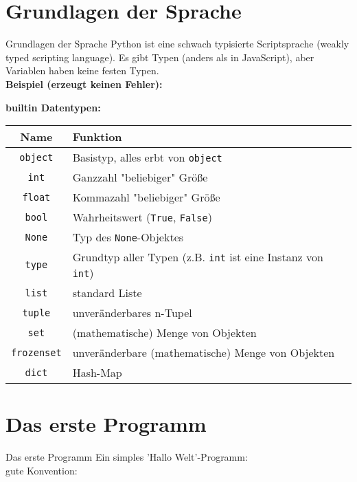 \section{Grundlagen der Sprache}
\begin{frame}[fragile]{Grundlagen der Sprache}
    Python ist eine schwach typisierte Scriptsprache (weakly typed scripting language). Es gibt Typen (anders als in JavaScript), aber Variablen haben keine festen Typen.\\

    \textbf{Beispiel (erzeugt keinen Fehler):}
    
\end{frame}

\begin{frame}
	\textbf{builtin Datentypen:}\\
	\begin{tabular}{c|l}
		Name & Funktion \\ \hline
		\texttt{object} & Basistyp, alles erbt von \texttt{object} \\
		\texttt{int} & Ganzzahl "beliebiger" Größe \\
		\texttt{float} & Kommazahl "beliebiger" Größe \\
		\texttt{bool} & Wahrheitswert (\texttt{True}, \texttt{False})\\
		\texttt{None} & Typ des \texttt{None}-Objektes \\
		\texttt{type} & Grundtyp aller Typen (z.B. \texttt{int} ist eine Instanz von \texttt{int}) \\
		\texttt{list} & standard Liste \\
		\texttt{tuple} & unveränderbares n-Tupel \\
		\texttt{set} & (mathematische) Menge von Objekten \\
		\texttt{frozenset} & unveränderbare (mathematische) Menge von Objekten \\
		\texttt{dict} & Hash-Map \\
	\end{tabular}
\end{frame}


\section{Das erste Programm}
\begin{frame}[fragile]{Das erste Programm}
	Ein simples 'Hallo Welt'-Programm:\\[.5cm]
	
	gute Konvention:\\[.5cm]
	
\end{frame}


